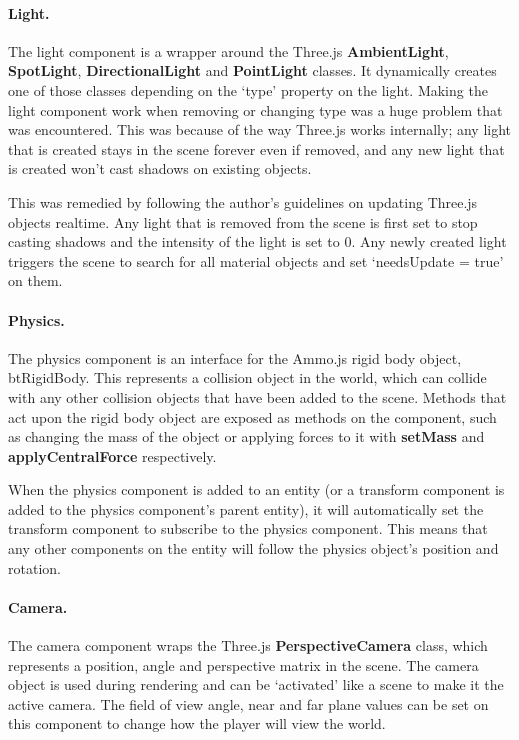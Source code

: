 	\paragraph{Light.}
	The light component is a wrapper around the Three.js \textbf{AmbientLight}, \textbf{SpotLight}, \textbf{DirectionalLight} and \textbf{PointLight} classes. It dynamically creates one of those classes depending on the `type' property on the light. Making the light component work when removing or changing type was a huge problem that was encountered. This was because of the way Three.js works internally; any light that is created stays in the scene forever even if removed, and any new light that is created won't cast shadows on existing objects.

	This was remedied by following the author's guidelines on updating Three.js objects realtime. Any light that is removed from the scene is first set to stop casting shadows and the intensity of the light is set to 0. Any newly created light triggers the scene to search for all material objects and set `needsUpdate = true' on them.


	\paragraph{Physics.}
	The physics component is an interface for the Ammo.js rigid body object, btRigidBody. This represents a collision object in the world, which can collide with any other collision objects that have been added to the scene. Methods that act upon the rigid body object are exposed as methods on the component, such as changing the mass of the object or applying forces to it with \textbf{setMass} and \textbf{applyCentralForce} respectively.

	When the physics component is added to an entity (or a transform component is added to the physics component's parent entity), it will automatically set the transform component to subscribe to the physics component. This means that any other components on the entity will follow the physics object's position and rotation.

	\paragraph{Camera.}
	The camera component wraps the Three.js \textbf{PerspectiveCamera} class, which represents a position, angle and perspective matrix in the scene. The camera object is used during rendering and can be `activated' like a scene to make it the active camera. The field of view angle, near and far plane values can be set on this component to change how the player will view the world.

